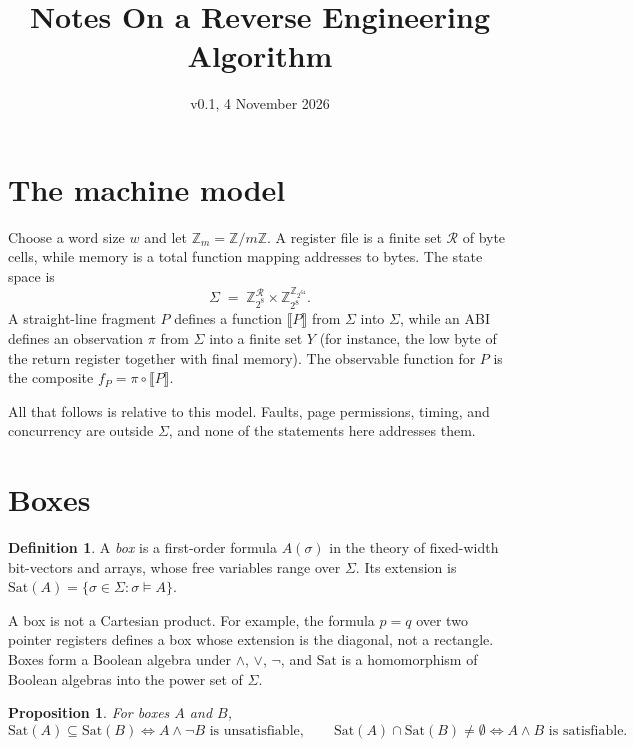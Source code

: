 \documentclass[11pt]{article}
\title{Notes On a Reverse Engineering Algorithm}
\author{}
\date{v0.1, 4 November 2026}
\newtheorem{proposition}[theorem]{Proposition}
\theoremstyle{definition}
\newtheorem{definition}[theorem]{Definition}
\theoremstyle{remark}
\newcommand{\Z}{\mathbb{Z}}
\newcommand{\Sat}{\mathrm{Sat}}
\begin{document}
\maketitle

\section{The machine model}

Choose a word size $w$ and let $\Z_m = \Z/m\Z$. A register file is a finite set $\mathcal{R}$ of byte cells, while memory is a total function mapping addresses to bytes. The state space is
\[
  \Sigma \;=\; \Z_{2^8}^{\mathcal{R}} \times \Z_{2^8}^{\Z_{2^{64}}}.
\]
A straight-line fragment $P$ defines a function $\llbracket P \rrbracket$ from $\Sigma$ into $\Sigma$, while an ABI defines an observation $\pi$ from $\Sigma$ into a finite set $Y$ (for instance, the low byte of the return register together with final memory). The observable function for $P$ is the composite $f_P = \pi \circ \llbracket P \rrbracket$.

All that follows is relative to this model. Faults, page permissions, timing, and concurrency are outside $\Sigma$, and none of the statements here addresses them.

\section{Boxes}

\begin{definition}
A \emph{box} is a first-order formula $A(\sigma)$ in the theory of fixed-width bit-vectors and arrays, whose free variables range over $\Sigma$. Its extension is $\Sat(A) = \{\sigma \in \Sigma : \sigma \models A\}$.
\end{definition}

A box is not a Cartesian product. For example, the formula $p = q$ over two pointer registers defines a box whose extension is the diagonal, not a rectangle. Boxes form a Boolean algebra under $\wedge$, $\vee$, $\neg$, and $\Sat$ is a homomorphism of Boolean algebras into the power set of $\Sigma$.

\begin{proposition}\label{prop:containment}
For boxes $A$ and $B$,
\[
  \Sat(A) \subseteq \Sat(B) \iff A \wedge \neg B \text{ is unsatisfiable}, \qquad
  \Sat(A) \cap \Sat(B) \neq \emptyset \iff A \wedge B \text{ is satisfiable}.
\]
\end{proposition}
\end{document}
